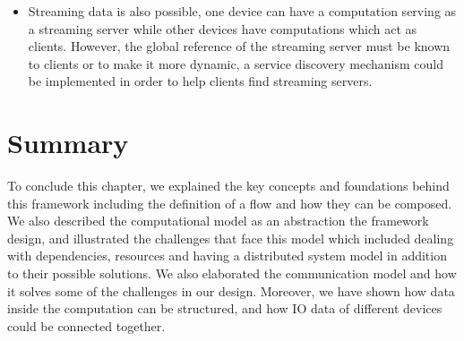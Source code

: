 \begin{itemize}
	\item Streaming data is also possible, one device can have a computation serving as a streaming server while other devices have computations which act as clients. However, the global reference of the streaming server must be known to clients or to make it more dynamic, a service discovery mechanism could be implemented in order to help clients find streaming servers.
\end{itemize}	


\section{Summary}

To conclude this chapter, we explained the key concepts and foundations behind this framework including the definition of a flow and how they can be composed. We also described the computational model as an abstraction the framework design, and illustrated the challenges that face this model which included  dealing with dependencies, resources and having a distributed system model in addition to their possible solutions. We also elaborated the communication model and how it solves some of the challenges in our design. Moreover, we have shown how data inside the computation can be structured, and how IO data of different devices could be connected together.


